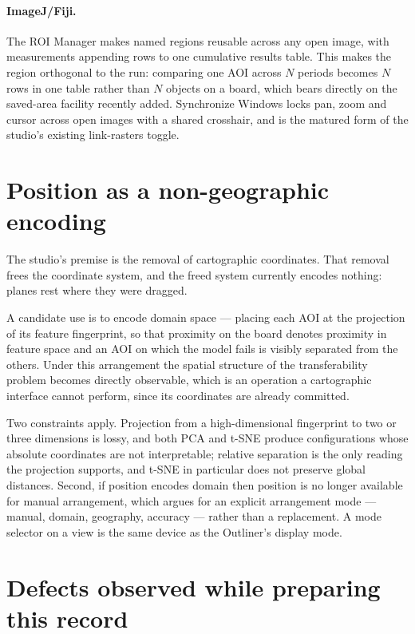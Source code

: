 \documentclass[11pt,a4paper]{article}
\begin{document}
\paragraph{ImageJ/Fiji.} The ROI Manager makes named regions reusable across any
open image, with measurements appending rows to one cumulative results table.
This makes the region orthogonal to the run: comparing one AOI across $N$
periods becomes $N$ rows in one table rather than $N$ objects on a board, which
bears directly on the saved-area facility recently added. Synchronize Windows
locks pan, zoom and cursor across open images with a shared crosshair, and is
the matured form of the studio's existing link-rasters toggle.

\section{Position as a non-geographic encoding}

The studio's premise is the removal of cartographic coordinates. That removal
frees the coordinate system, and the freed system currently encodes nothing:
planes rest where they were dragged.

A candidate use is to encode domain space --- placing each AOI at the projection
of its feature fingerprint, so that proximity on the board denotes proximity in
feature space and an AOI on which the model fails is visibly separated from the
others. Under this arrangement the spatial structure of the transferability
problem becomes directly observable, which is an operation a cartographic
interface cannot perform, since its coordinates are already committed.

Two constraints apply. Projection from a high-dimensional fingerprint to two or
three dimensions is lossy, and both PCA and t-SNE produce configurations whose
absolute coordinates are not interpretable; relative separation is the only
reading the projection supports, and t-SNE in particular does not preserve
global distances. Second, if position encodes domain then position is no longer
available for manual arrangement, which argues for an explicit arrangement mode
--- manual, domain, geography, accuracy --- rather than a replacement. A mode
selector on a view is the same device as the Outliner's display mode.

\section{Defects observed while preparing this record}
\end{document}
